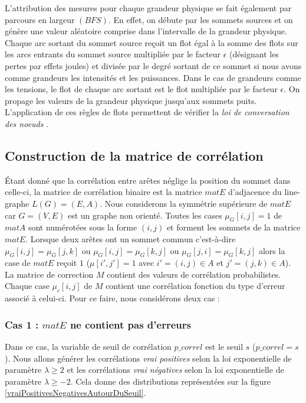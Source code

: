 \documentclass[onecolumn, 12pt]{book}
\begin{document}
\newline
L'attribution des mesures pour chaque grandeur physique se fait \'egalement par parcours en largeur $(BFS)$. 
En effet,  on d\'ebute par les sommets sources et on g\'en\`ere une valeur al\'eatoire comprise dans l'intervalle de la grandeur physique. 
Chaque arc sortant du sommet source re\c coit  un flot \'egal \`a la somme des flots sur les arcs entrants du sommet source multipli\'ee par le facteur $\epsilon$ (d\'esignant les pertes par effets joules) et divis\'ee par le degr\'e sortant de ce sommet si nous avons comme grandeurs les intensit\'es et les puissances.
Dans le cas de grandeurs comme les tensions, le flot de chaque arc sortant est le flot multipli\'ee par le facteur $\epsilon$. 
On propage les valeurs de la grandeur physique jusqu'aux sommets puits.
L'application de ces r\`egles de flots permettent de v\'erifier la {\em loi de conversation des noeuds} \cite{loiDeConservation}.

\subsection{Construction de la matrice de corr\'elation}
\'Etant donn\'e que la corr\'elation entre ar\^etes n\'eglige la position du sommet dans celle-ci, la matrice de corr\'elation binaire est la matrice $matE$ d'adjacence du line-graphe $L(G)= (E, A)$. %
\newline
Nous considerons la symm\'etrie sup\'erieure de $matE$ car $G=(V,E)$ est un graphe non orient\'e. 
Toutes les cases $\mu_G[i,j] = 1$ de $matA$ sont num\'erot\'ees sous la forme $(i,j)$ et forment les sommets de la matrice $matE$. Lorsque deux ar\^etes ont un sommet commun c'est-\`a-dire $\mu_G[i,j]  = \mu_G[j,k] $ ou $\mu_G[i,j]  = \mu_G[k,j]$ ou $\mu_G[j,i]  = \mu_G[k,j] $ alors la case de $matE$ re\c coit $1$ ($\mu[i',j'] = 1$ avec $i' = (i,j) \in A$ et $j' = (j,k) \in A$).
\newline
La matrice de correction $M$ contient des valeurs de corr\'elation probabilistes. 
Chaque case $\mu_c[i,j]$ de $M$ contient une corr\'elation fonction du type d'erreur associ\'e \`a celui-ci. 
Pour ce faire, nous consid\'erons deux cas :
\subsubsection{Cas 1 : $matE$ ne contient pas d'erreurs }
Dans ce cas, la variable de seuil de corr\'elation $p\_correl$ est le seuil $s$ ($p\_correl = s$). 
Nous allons g\'en\'erer les corr\'elations {\em vrai positives}  selon la loi exponentielle de param\`etre $\lambda \ge 2$ et les corr\'elations {\em vrai n\'egatives} selon la loi exponentielle de param\`etre $\lambda \ge -2$. Cela donne des distributions repr\'esent\'ees sur la figure \ref{vraiPositivesNegativesAutourDuSeuil}.
\end{document}

